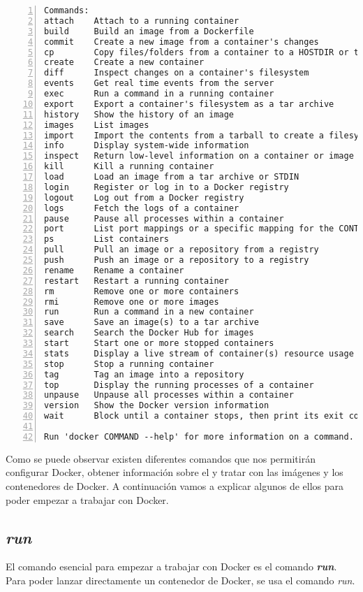 \begin{lstlisting}[style=consola,numbers=left]
Commands:
attach    Attach to a running container
build     Build an image from a Dockerfile
commit    Create a new image from a container's changes
cp        Copy files/folders from a container to a HOSTDIR or to STDOUT
create    Create a new container
diff      Inspect changes on a container's filesystem
events    Get real time events from the server
exec      Run a command in a running container
export    Export a container's filesystem as a tar archive
history   Show the history of an image
images    List images
import    Import the contents from a tarball to create a filesystem image
info      Display system-wide information
inspect   Return low-level information on a container or image
kill      Kill a running container
load      Load an image from a tar archive or STDIN
login     Register or log in to a Docker registry
logout    Log out from a Docker registry
logs      Fetch the logs of a container
pause     Pause all processes within a container
port      List port mappings or a specific mapping for the CONTAINER
ps        List containers
pull      Pull an image or a repository from a registry
push      Push an image or a repository to a registry
rename    Rename a container
restart   Restart a running container
rm        Remove one or more containers
rmi       Remove one or more images
run       Run a command in a new container
save      Save an image(s) to a tar archive
search    Search the Docker Hub for images
start     Start one or more stopped containers
stats     Display a live stream of container(s) resource usage statistics
stop      Stop a running container
tag       Tag an image into a repository
top       Display the running processes of a container
unpause   Unpause all processes within a container
version   Show the Docker version information
wait      Block until a container stops, then print its exit code

Run 'docker COMMAND --help' for more information on a command.
	\end{lstlisting}
	
	Como se puede observar existen diferentes comandos que nos permitirán configurar Docker, obtener información sobre el y tratar con las imágenes y los contenedores de Docker. A continuación vamos a explicar algunos de ellos para poder empezar a trabajar con Docker. 
	
	\subsection{\textit{run}}
	El comando esencial para empezar a trabajar con Docker es el comando \textbf{\emph{run}}. Para poder lanzar directamente un contenedor de Docker, se usa el comando \textit{run}.
	
